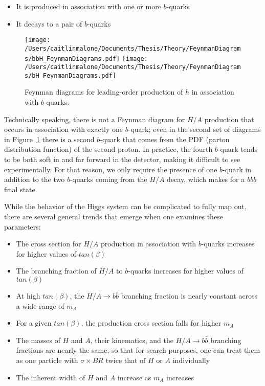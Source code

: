 \begin{itemize}
    \item It is produced in association with one or more $b$-quarks
    \item It decays to a pair of $b$-quarks
\end{itemize}

\begin{figure}[H]
	\texttt{[image: /Users/caitlinmalone/Documents/Thesis/Theory/FeynmanDiagrams/bbH\_FeynmanDiagrams.pdf]}		
	\texttt{[image: /Users/caitlinmalone/Documents/Thesis/Theory/FeynmanDiagrams/bH\_FeynmanDiagrams.pdf]}
	\caption{Feynman diagrams for leading-order production of $h$ in association with $b$-quarks.  \label{fig:fd}}
\end{figure}

Technically speaking, there is not a Feynman diagram for $H/A$ production that occurs in association with exactly one $b$-quark; even in the second set of diagrams in Figure~\ref{fig:fd} there is a second $b$-quark that comes from the PDF (parton distribution function) of the second proton.  In practice, the fourth $b$-quark tends to be both soft in \pt and far forward in the detector, making it difficult to see experimentally.  For that reason, we only require the presence of one $b$-quark in addition to the two $b$-quarks coming from the $H/A$ decay, which makes for a $bbb$ final state.



While the behavior of the Higgs system can be complicated to fully map out, there are several general trends that emerge when one examines these parameters:

\begin{itemize}
	\item The cross section for $H/A$ production in association with $b$-quarks increases for higher values of $tan(\beta)$
	\item The branching fraction of $H/A$ to $b$-quarks increases for higher values of $tan(\beta)$
	\item At high $tan(\beta)$, the $H/A\rightarrow b\bar{b}$ branching fraction is nearly constant across a wide range of $m_A$
	\item For a given $tan(\beta)$, the production cross section falls for higher $m_A$
	\item The masses of $H$ and $A$, their kinematics, and the $H/A\rightarrow b\bar{b}$ branching fractions are nearly the same, so that for search purposes, one can treat them as one particle with $\sigma \times BR$ twice that of $H$ or $A$ individually
	\item The inherent width of $H$ and $A$ increase as $m_A$ increases 
\end{itemize}





